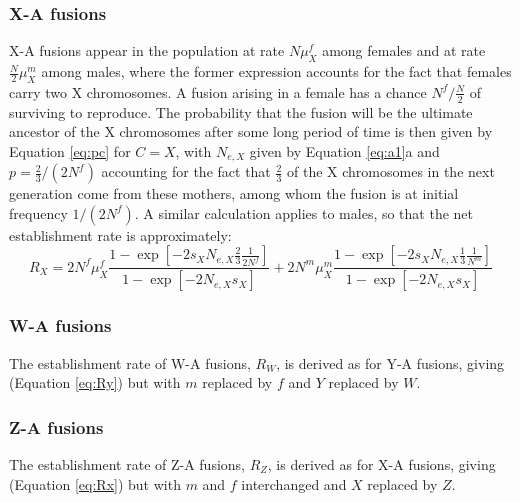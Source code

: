 \subsubsection{X-A fusions}

X-A fusions appear in the population at rate $N\mu^f_X$ among females and at rate $\frac{N}{\text{2}}\mu^m_X$ among males, where the former expression accounts for the fact that females carry two X chromosomes. A fusion arising in a female has a chance $N^f/\frac{N}{\text{2}}$ of surviving to reproduce. The probability that the fusion will be the ultimate ancestor of the X chromosomes after some long period of time is then given by Equation \ref{eq:pc} for $C = X$, with $N_{e,X}$ given by Equation \ref{eq:a1}a and $p=\frac{\text{2}}{\text{3}}/(\text{2}N^f)$ accounting for the fact that $\frac{\text{2}}{\text{3}}$ of the X chromosomes in the next generation come from these mothers, among whom the fusion is at initial frequency $\text{1}/(\text{2}N^f)$. A similar calculation applies to males, so that the net establishment rate is approximately:
\begin{equation}\label{eq:Rx}
R_X = \text{2}N^f\mu^f_X 
\frac{\text{1}- \exp[-\text{2}s_X N_{e,X}  \frac{\text{2}}{\text{3}} \frac{\text{1}}{\text{2}N^f} ]}{\text{1} - \exp[-\text{2}N_{e,X} s_X]} 
+ \text{2}N^m\mu^m_X \frac{\text{1}- \exp[-\text{2}s_X N_{e,X}  \frac{\text{1}}{\text{3}} \frac{\text{1}}{N^m}]}{\text{1} - \exp[-\text{2}N_{e,X} s_X]}
\end{equation}

\subsubsection{W-A fusions}
The establishment rate of W-A fusions, $R_W$, is derived as for Y-A fusions, giving (Equation \ref{eq:Ry}) but with $m$ replaced by $f$ and $Y$ replaced by $W$.

\subsubsection{Z-A fusions}
The establishment rate of Z-A fusions, $R_Z$, is derived as for X-A fusions, giving (Equation \ref{eq:Rx}) but with $m$ and $f$ interchanged and $X$ replaced by $Z$.

